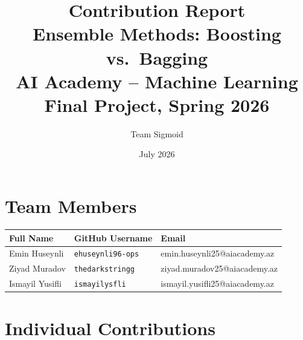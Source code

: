 \documentclass[11pt,a4paper]{article}
\title{\textbf{Contribution Report}\\[0.5em]
       \large Ensemble Methods: Boosting vs.\ Bagging\\
       AI Academy -- Machine Learning Final Project, Spring 2026}
\author{Team Sigmoid}
\date{July 2026}
\begin{document}
\maketitle

\section*{Team Members}

\begin{center}
\begin{tabular}{lll}
\toprule
\textbf{Full Name} & \textbf{GitHub Username} & \textbf{Email} \\
\midrule
Emin Huseynli   & \texttt{ehuseynli96-ops} & emin.huseynli25@aiacademy.az \\
Ziyad Muradov   & \texttt{thedarkstringg}  & ziyad.muradov25@aiacademy.az \\
Ismayil Yusifli & \texttt{ismayilysfli}    & ismayil.yusifli25@aiacademy.az \\
\bottomrule
\end{tabular}
\end{center}

\section*{Individual Contributions}
\end{document}
